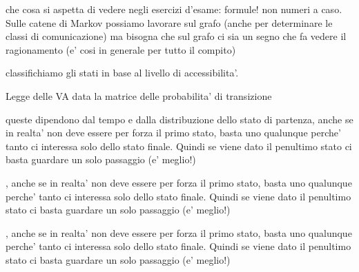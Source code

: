 che cosa si aspetta di vedere negli esercizi d'esame: formule! non numeri a caso. Sulle catene di Markov possiamo lavorare sul grafo (anche per determinare le classi di comunicazione) ma bisogna che sul grafo ci sia un segno che fa vedere il ragionamento (e' cosi in generale per tutto il compito)

classifichiamo gli stati in base al livello di accessibilita'. 

Legge delle VA data la matrice delle probabilita' di transizione

queste dipendono dal tempo e dalla distribuzione dello stato di partenza, anche se in realta' non deve essere per forza il primo stato, basta uno qualunque perche' tanto ci interessa solo dello stato finale. Quindi se viene dato il penultimo stato ci basta guardare un solo passaggio (e' meglio!)

, anche se in realta' non deve essere per forza il primo stato, basta uno qualunque perche' tanto ci interessa solo dello stato finale. Quindi se viene dato il penultimo stato ci basta guardare un solo passaggio (e' meglio!)

, anche se in realta' non deve essere per forza il primo stato, basta uno qualunque perche' tanto ci interessa solo dello stato finale. Quindi se viene dato il penultimo stato ci basta guardare un solo passaggio (e' meglio!)


% 

